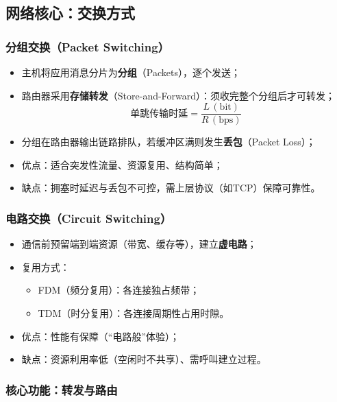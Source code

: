\subsection{网络核心：交换方式}

\subsubsection{分组交换（Packet Switching）}

\begin{itemize}
    \item 主机将应用消息分片为\textbf{分组}（Packets），逐个发送；
    \item 路由器采用\textbf{存储转发}（Store-and-Forward）：须收完整个分组后才可转发；
          \[
              \text{单跳传输时延} = \frac{L\,(\text{bit})}{R\,(\text{bps})}
          \]
    \item 分组在路由器输出链路排队，若缓冲区满则发生\textbf{丢包}（Packet Loss）；
    \item 优点：适合突发性流量、资源复用、结构简单；
    \item 缺点：拥塞时延迟与丢包不可控，需上层协议（如TCP）保障可靠性。
\end{itemize}

\subsubsection{电路交换（Circuit Switching）}

\begin{itemize}
    \item 通信前预留端到端资源（带宽、缓存等），建立\textbf{虚电路}；
    \item 复用方式：
          \begin{itemize}
              \item FDM（频分复用）：各连接独占频带；
              \item TDM（时分复用）：各连接周期性占用时隙。
          \end{itemize}
    \item 优点：性能有保障（“电路般”体验）；
    \item 缺点：资源利用率低（空闲时不共享）、需呼叫建立过程。
\end{itemize}

\subsubsection{核心功能：转发与路由}

